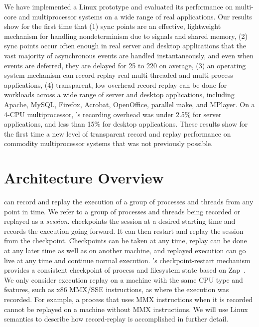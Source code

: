We have implemented a \scribe{} Linux prototype and evaluated its
performance on multi-core and multiprocessor systems on a wide
range of real applications.  Our results show for the first time that
(1) sync points are an effective, lightweight mechanism for handling
nondeterminism due to signals and shared memory, (2) sync points occur
often enough in real server and desktop applications that the vast
majority of asynchronous events are handled instantaneously, and even
when events are deferred, they are delayed for 25 to 220\us{} on
average, (3) an operating system mechanism can record-replay real
multi-threaded and multi-process applications, (4) transparent,
low-overhead record-replay
can be done for workloads across a wide range of server and
desktop applications, including Apache, MySQL, Firefox, Acrobat,
OpenOffice, parallel make, and MPlayer.  On a 4-CPU multiprocessor,
\scribe{}'s recording overhead was under 2.5\% for server
applications, and less than 15\% for desktop applications.  These
results show for the first time a new level of transparent record and
replay performance on commodity multiprocessor systems that was not
previously possible. 

\section{Architecture Overview}
\label{scribe:sec:arch}

\scribe{} can record and replay the execution of a group of processes
and threads from any point in time.  We refer to a group of processes
and threads being recorded or replayed as a {\em session}.  \scribe{}
checkpoints the session at a desired starting time and records the
execution going forward.  It can then restart and replay the
session from the checkpoint.  Checkpoints can be taken at any time,
replay can be done at any later time as well as on another
machine, and replayed execution can go live at any time and continue
normal execution.  \scribe{}'s checkpoint-restart mechanism
provides a consistent checkpoint of process and filesystem state
based on Zap~\cite{dejaview,zap07,zap02}.
We only consider
execution replay on a machine with the same CPU type and features,
such as x86 MMX/SSE instructions, as where the execution was recorded.
For example, a process that uses MMX instructions when it is
recorded cannot be replayed on a machine without MMX instructions.   
We will use Linux semantics to describe how
record-replay is accomplished in further detail.

